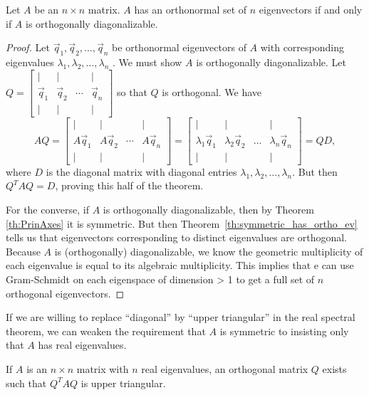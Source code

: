 \documentclass{ximera}
\begin{document}
\begin{theorem}\label{th:PrinAxesOtherStuff}
Let $A$ be an $n \times n$ matrix.  $A$ has an orthonormal set of $n$ eigenvectors if and only if $A$ is orthogonally diagonalizable.

\begin{proof}
Let $\vec{q}_{1}, \vec{q}_{2}, \dots, \vec{q}_{n}$ be orthonormal eigenvectors of $A$ with corresponding eigenvalues $\lambda_1, \lambda_2, \ldots, \lambda_n$ .  We must show $A$ is orthogonally diagonalizable. Let $Q = \begin{bmatrix}
| & | &   & | \\
\vec{q}_1 & \vec{q}_2  & \cdots & \vec{q}_n \\
| & | &   & |
\end{bmatrix}$ so that $Q$ is orthogonal.  We have
$$AQ = \begin{bmatrix}
| & | &   & | \\
A\vec{q}_1 & A\vec{q}_2  & \cdots & A\vec{q}_n \\
| & | &   & |
\end{bmatrix} = \begin{bmatrix}
| & | &   & | \\
\lambda_1 \vec{q}_{1} & \lambda_2 \vec{q}_{2} & \dots & \lambda_n \vec{q}_{n} \\
| & | &   & |
\end{bmatrix}=QD, $$
where $D$ is the diagonal matrix with diagonal entries $\lambda_1, \lambda_2, \ldots, \lambda_n$.  But then $Q^TAQ=D$, proving this half of the theorem.

For the converse, if $A$ is orthogonally diagonalizable, then by Theorem \ref{th:PrinAxes} it is symmetric.  But then Theorem~\ref{th:symmetric_has_ortho_ev} tells us that eigenvectors corresponding to distinct eigenvalues are orthogonal.  Because $A$ is (orthogonally) diagonalizable, we know the geometric multiplicity of each eigenvalue is equal to its algebraic multiplicity.  This implies that e can use Gram-Schmidt on each eigenspace of dimension > 1 to get a full set of $n$ orthogonal eigenvectors.
\end{proof}
\end{theorem}

If we are willing to replace ``diagonal'' by ``upper triangular'' in the real spectral theorem, we can weaken the requirement that $A$ is symmetric to insisting only that $A$ has real eigenvalues.

\begin{theorem}\label{th:Schur}
If $A$ is an $n \times n$ matrix with $n$ real eigenvalues, an orthogonal matrix $Q$ exists such that $Q^{T}AQ$ is upper triangular.
\end{theorem}
\end{document}
